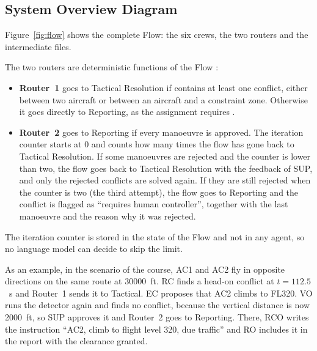 \subsection{System Overview Diagram}
\label{sec:overview}

Figure~\ref{fig:flow} shows the complete Flow: the six crews, the two routers and the
intermediate files.


The two routers are deterministic functions of the Flow \cite{crewai_flows}:

\begin{itemize}
  \item \textbf{Router~1} goes to Tactical Resolution if 
        contains at least one conflict, either between two aircraft or between an aircraft
        and a constraint zone. Otherwise it goes directly to Reporting, as the assignment
        requires \cite{mas_assignment}.
    \item \textbf{Router~2} goes to Reporting if every manoeuvre is approved. The iteration
        counter starts at 0 and counts how many times the flow has gone back to Tactical
        Resolution. If some manoeuvres are rejected and the counter is lower than two, the
        flow goes back to Tactical Resolution with the feedback of SUP, and only the rejected
        conflicts are solved again. If they are still rejected when the counter is two (the
        third attempt), the flow goes to Reporting and the conflict is flagged as ``requires
        human controller'', together with the last manoeuvre and the reason why it was
        rejected.
\end{itemize}

The iteration counter is stored in the state of the Flow and not in any agent, so no
language model can decide to skip the limit.

As an example, in the scenario  of the course, AC1 and AC2 fly in
opposite directions on the same route at 30000~ft. RC finds a head-on conflict at
$t = 112.5$~s and Router~1 sends it to Tactical. EC proposes that AC2 climbs to FL320. VO
runs the detector again and finds no conflict, because the vertical distance is now
2000~ft, so SUP approves it and Router~2 goes to Reporting. There, RCO writes the
instruction ``AC2, climb to flight level 320, due traffic'' and RO includes it in the
report with the clearance granted.

